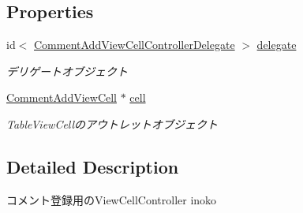 \subsection*{Properties}
\begin{DoxyCompactItemize}
\item 
\hypertarget{interface_comment_add_view_cell_controller_ae12f749b163024ff5ea15e23aaaf5a3a}{
id$<$ \hyperlink{protocol_comment_add_view_cell_controller_delegate-p}{CommentAddViewCellControllerDelegate} $>$ \hyperlink{interface_comment_add_view_cell_controller_ae12f749b163024ff5ea15e23aaaf5a3a}{delegate}}
\label{interface_comment_add_view_cell_controller_ae12f749b163024ff5ea15e23aaaf5a3a}

\begin{DoxyCompactList}\small\item\em デリゲートオブジェクト \end{DoxyCompactList}\item 
\hypertarget{interface_comment_add_view_cell_controller_a7e720ff244ee58abe88d45e9cd7612af}{
\hyperlink{interface_comment_add_view_cell}{CommentAddViewCell} $\ast$ \hyperlink{interface_comment_add_view_cell_controller_a7e720ff244ee58abe88d45e9cd7612af}{cell}}
\label{interface_comment_add_view_cell_controller_a7e720ff244ee58abe88d45e9cd7612af}

\begin{DoxyCompactList}\small\item\em TableViewCellのアウトレットオブジェクト \end{DoxyCompactList}\end{DoxyCompactItemize}


\subsection{Detailed Description}
コメント登録用のViewCellController  inoko 

